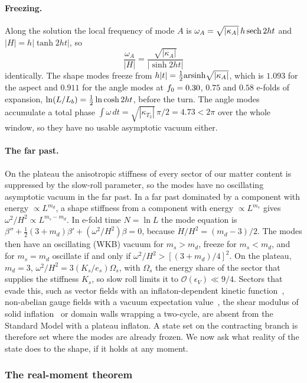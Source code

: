 \paragraph{Freezing.}
Along the solution the local frequency of mode $A$ is $\omega_A=\sqrt{|\kappa_A|}\,h\,{\rm sech}\,2ht$ and $|H|=h|\tanh2ht|$, so
\begin{equation}
\frac{\omega_A}{|H|}=\frac{\sqrt{|\kappa_A|}}{|\sinh2ht|}
\end{equation}
identically.
The shape modes freeze from $h|t|=\tfrac12{\rm arsinh}\sqrt{|\kappa_A|}$, which is $1.093$ for the aspect and $0.911$ for the angle modes at $f_0=0.30$, $0.75$ and $0.58$ e-folds of expansion, $\ln(L/L_b)=\tfrac12\ln\cosh2ht$, before the turn. %
The angle modes accumulate a total phase $\int\omega\,dt=\sqrt{|\kappa_{T_2}|}\,\pi/2=4.73<2\pi$ over the whole window, so they have no usable asymptotic vacuum either. %

\paragraph{The far past.}
On the plateau the anisotropic stiffness of every sector of our matter content is suppressed by the slow-roll parameter, so the modes have no oscillating asymptotic vacuum in the far past.
In a far past dominated by a component with energy $\propto L^{m_d}$, a shape stiffness from a component with energy $\propto L^{m_s}$ gives $\omega^2/H^2\propto L^{m_s-m_d}$.
In e-fold time $N=\ln L$ the mode equation is $\beta''+\tfrac12(3+m_d)\beta'+(\omega^2/H^2)\beta=0$, because $\dot H/H^2=(m_d-3)/2$.
The modes then have an oscillating (WKB) vacuum for $m_s>m_d$, freeze for $m_s<m_d$, and for $m_s=m_d$ oscillate if and only if $\omega^2/H^2>[(3+m_d)/4]^2$.
On the plateau, $m_d=3$, $\omega^2/H^2=3(K_s/e_s)\Omega_s$, with $\Omega_s$ the energy share of the sector that supplies the stiffness $K_s$, so slow roll limits it to $\mathcal O(\epsilon_V)\ll9/4$.
Sectors that evade this, such as vector fields with an inflaton-dependent kinetic function~\cite{Watanabe:2009ct}, non-abelian gauge fields with a vacuum expectation value~\cite{Maleknejad:2011jw,Adshead:2012kp}, the shear modulus of solid inflation~\cite{Endlich:2012pz} or domain walls wrapping a two-cycle, are absent from the Standard Model with a plateau inflaton.
A state set on the contracting branch is therefore set where the modes are already frozen.
We now ask what reality of the state does to the shape, if it holds at any moment.

\subsubsection{The real-moment theorem}
\label{rA:s-realmoment}

